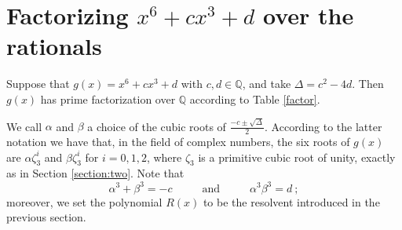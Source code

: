 \documentclass[11pt,a4paper]{article}
\numberwithin{equation}{section}
\newcommand{\Q}{\mathbb{Q}}
\theoremstyle{definition}
\begin{document}
\section{Factorizing \texorpdfstring{$x^6+cx^3+d$}{x6+cx3+d} over the rationals}
\label{section:three}
Suppose that $g(x)=x^6+cx^3+d$ with $c,d\in\Q$, and take $\Delta=c^2-4d$. Then $g(x)$ has prime factorization over $\Q$ according to Table \ref{factor}. 

We call $\alpha$ and $\beta$ a choice of the cubic roots of $\frac{-c\pm\sqrt\Delta}{2}$. According to the latter notation we have that, in the field of complex numbers, the six roots of $g(x)$ are $\alpha\zeta^i_3$ and $\beta\zeta_3^i$ for $i=0,1,2$, where $\zeta_3$ is a primitive cubic root of unity, exactly as in Section \ref{section:two}. Note that \[\alpha^3+\beta^3=-c\hspace{1cm}\text{ and }\hspace{1cm}\alpha^3\beta^3=d\:;\] moreover, we set the polynomial $R(x)$ to be the resolvent introduced in the previous section.
\end{document}
